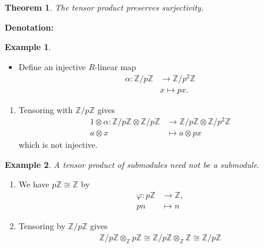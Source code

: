 \documentclass[a4paper]{book}
\theoremstyle{definition}
\newtheorem{example}{Example}[definition]
\newtheorem{theorem}[definition]{Theorem}
\begin{document}
\begin{theorem} \textit{The tensor product preserves surjectivity.}

    \noindent\textbf{Denotation: }
\end{theorem}


\begin{example}
    \begin{itemize}
        \item Define an injective \(R\)-linear map
        \begin{align*}
            \alpha: \mathbb{Z} / p\mathbb{Z} &\rightarrow \mathbb{Z} / p^2 \mathbb{Z} \\
            &x \mapsto px \text{.}
        \end{align*}
    \end{itemize}
    \begin{enumerate}
        \item Tensoring with \(\mathbb{Z} / p \mathbb{Z}\) gives 
        \begin{align*}
            1 \otimes \alpha: \mathbb{Z} / p\mathbb{Z} \otimes \mathbb{Z} / p\mathbb{Z} &\rightarrow \mathbb{Z} / p\mathbb{Z} \otimes \mathbb{Z} / p^2 \mathbb{Z} \\
            a \otimes x &\mapsto a \otimes px
        \end{align*}
        which is not injective.
    \end{enumerate}
\end{example}


\begin{example}
    \textit{A tensor product of submodules need not be a submodule.}
    \begin{enumerate}
        \item We have \(p \mathbb{Z} \cong \mathbb{Z}\) by \begin{align*}
            \varphi: p \mathbb{Z} &\rightarrow \mathbb{Z},\\
            pn &\mapsto n
        \end{align*}
        \item Tensoring by \(\mathbb{Z} / p \mathbb{Z}\) gives \begin{align*}
            \mathbb{Z} / p \mathbb{Z} \otimes_\mathbb{Z} p \mathbb{Z} \cong \mathbb{Z} / p \mathbb{Z} \otimes_\mathbb{Z} \mathbb{Z} \cong \mathbb{Z} / p \mathbb{Z}
        \end{align*}
    \end{enumerate}
\end{example}
\end{document}
